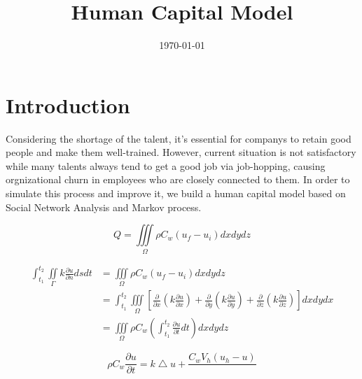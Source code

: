\documentclass[12pt,a4paper,titlepage]{article}
\begin{document}
\title{Human Capital Model} \date{\today{}}
\maketitle

\tableofcontents

\newpage

\section{Introduction}
\label{sec:introduction}

Considering the shortage of the talent, it's essential for companys to
retain good people and make them well-trained. However, current
situation is not satisfactory while many talents always tend to get a
good job via job-hopping, causing orgnizational churn in employees who
are closely connected to them. In order to simulate this process and
improve it, we build a human capital model based on Social Network
Analysis and Markov process.

\begin{displaymath}
Q=\iiint\limits_{\Omega}\rho C_{w}(u_f - u_i)dx dy dz
\end{displaymath}

\begin{displaymath}
\begin{aligned}
\int_{t_1}^{t_2} \iint\limits_{\Gamma}k\frac{\partial u}{\partial n}dsdt & =\iiint\limits_{\Omega}\rho C_{w}(u_f - u_i)dx dy dz\\
& =\int_{t_1}^{t_2}\iiint\limits_{\Omega}[\frac{\partial}{\partial x}(k\frac{\partial u}{\partial x})+\frac{\partial}{\partial y}(k\frac{\partial u}{\partial y})+\frac{\partial}{\partial z}(k\frac{\partial u}{\partial z})]dxdydx\\
& = \iiint\limits_{\Omega}\rho C_{w}(\int_{t_1}^{t_2}\frac{\partial u}{\partial t}dt)dxdydz
\end{aligned}
\end{displaymath}

\begin{displaymath}
\rho C_{w}\frac{\partial u}{\partial t}=k\bigtriangleup u+\frac{C_w V_h(u_h-u)}{}
\end{displaymath}
\end{document}
